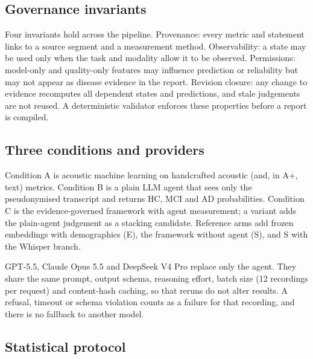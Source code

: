 \documentclass[pdflatex,sn-nature]{sn-jnl}
\begin{document}
\subsection{Governance invariants}\label{sec:m-gov}

Four invariants hold across the pipeline. Provenance: every metric and statement links to a source segment and a measurement method. Observability: a state may be used only when the task and modality allow it to be observed. Permissions: model-only and quality-only features may influence prediction or reliability but may not appear as disease evidence in the report. Revision closure: any change to evidence recomputes all dependent states and predictions, and stale judgements are not reused. A deterministic validator enforces these properties before a report is compiled.

\subsection{Three conditions and providers}\label{sec:m-cond}

Condition A is acoustic machine learning on handcrafted acoustic (and, in A+, text) metrics. Condition B is a plain LLM agent that sees only the pseudonymised transcript and returns HC, MCI and AD probabilities. Condition C is the evidence-governed framework with agent measurement; a variant adds the plain-agent judgement as a stacking candidate. Reference arms add frozen embeddings with demographics (E), the framework without agent (S), and S with the Whisper branch.

GPT-5.5, Claude Opus 5.5 and DeepSeek V4 Pro replace only the agent. They share the same prompt, output schema, reasoning effort, batch size (12 recordings per request) and content-hash caching, so that reruns do not alter results. A refusal, timeout or schema violation counts as a failure for that recording, and there is no fallback to another model.

\subsection{Statistical protocol}\label{sec:m-stats}
\end{document}

